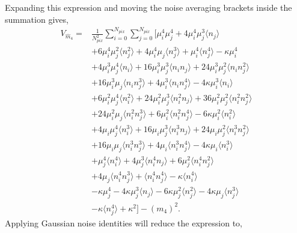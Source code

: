 \documentclass[fleqn,usenatbib]{mnras}
\begin{document}
Expanding this expression and moving the noise averaging brackets inside the summation gives,
\begin{align}
    V_{\hat{m}_4} = &\frac{1}{N_{pix}^2}
        \sum_{i=0}^{N_{pix}}\sum_{j=0}^{N_{pix}}
        \Big\lbrack\mu_i^4\mu_j^4 
        + 4\mu_i^4\mu_j^3\langle n_j \rangle \nonumber\\
        &+ 6\mu_i^4\mu_j^2\langle n_j^2 \rangle 
        + 4\mu_i^4\mu_j\langle n_j^3 \rangle 
        + \mu_i^4\langle n_j^4 \rangle 
        - \kappa\mu_i^4 \nonumber\\
        &+ 4\mu_i^3\mu_j^4\langle n_i \rangle
        + 16\mu_i^3\mu_j^3\langle n_i n_j \rangle 
        + 24\mu_i^3\mu_j^2\langle n_i n_j^2 \rangle\nonumber\\
        &+ 16\mu_i^3\mu_j\langle n_i n_j^3 \rangle 
        + 4\mu_i^3\langle n_i n_j^4 \rangle
        - 4\kappa\mu_i^3\langle n_i\rangle \nonumber\\
        &+ 6\mu_i^2\mu_j^4\langle n_i^2 \rangle 
        + 24\mu_i^2\mu_j^3\langle n_i^2n_j \rangle 
        + 36\mu_i^2\mu_j^2\langle n_i^2n_j^2 \rangle\nonumber\\ 
        &+ 24\mu_i^2\mu_j\langle n_i^2n_j^3 \rangle 
        + 6\mu_i^2\langle n_i^2n_j^4 \rangle
        - 6\kappa\mu_i^2\langle n_i^2\rangle \nonumber\\
        &+ 4\mu_i\mu_j^4\langle n_i^3 \rangle 
        + 16\mu_i\mu_j^3\langle n_i^3n_j \rangle 
        + 24\mu_i\mu_j^2\langle n_i^3n_j^2 \rangle\nonumber\\ 
        &+ 16\mu_i\mu_j\langle n_i^3n_j^3 \rangle 
        + 4\mu_i\langle n_i^3n_j^4 \rangle
        - 4\kappa\mu_i\langle n_i^3 \rangle \nonumber\\
        &+ \mu_j^4\langle n_i^4 \rangle 
        + 4\mu_j^3\langle n_i^4n_j \rangle 
        + 6\mu_j^2\langle n_i^4n_j^2 \rangle\nonumber\\ 
        &+ 4\mu_j\langle n_i^4n_j^3 \rangle 
        + \langle n_i^4n_j^4 \rangle
        - \kappa\langle n_i^4 \rangle \nonumber\\
        &- \kappa\mu_j^4
        - 4\kappa\mu_j^3\langle n_j \rangle
        - 6\kappa\mu_j^2\langle n_j^2 \rangle
        - 4\kappa\mu_j\langle n_j^3 \rangle \nonumber\\
        &- \kappa\langle n_j^4 \rangle
        + \kappa^2 \Big\rbrack - (m_4)^2.
\end{align}
Applying Gaussian noise identities will reduce the expression to,
\end{document}
